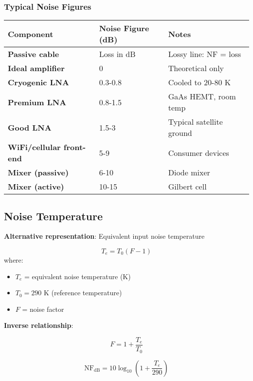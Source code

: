 \subsubsection{Typical Noise Figures}\label{typical-noise-figures}

{\def\LTcaptype{} %
\begin{longtable}[]{@{}lll@{}}
\toprule\noalign{}
Component & Noise Figure (dB) & Notes \\
\midrule\noalign{}
\endhead
\bottomrule\noalign{}
\endlastfoot
\textbf{Passive cable} & Loss in dB & Lossy line: NF = loss \\
\textbf{Ideal amplifier} & 0 & Theoretical only \\
\textbf{Cryogenic LNA} & 0.3-0.8 & Cooled to 20-80 K \\
\textbf{Premium LNA} & 0.8-1.5 & GaAs HEMT, room temp \\
\textbf{Good LNA} & 1.5-3 & Typical satellite ground \\
\textbf{WiFi/cellular front-end} & 5-9 & Consumer devices \\
\textbf{Mixer (passive)} & 6-10 & Diode mixer \\
\textbf{Mixer (active)} & 10-15 & Gilbert cell \\
\end{longtable}
}

\subsection{Noise Temperature}

\textbf{Alternative representation}: Equivalent input noise temperature

\begin{equation}
T_e = T_0 (F - 1)
\end{equation}
where:
\begin{itemize}
\item $T_e$ = equivalent noise temperature (K)
\item $T_0 = 290$ K (reference temperature)
\item $F$ = noise factor
\end{itemize}

\textbf{Inverse relationship}:

\begin{equation}
F = 1 + \frac{T_e}{T_0}
\end{equation}

\begin{equation}
\text{NF}_{\text{dB}} = 10\log_{10}\left(1 + \frac{T_e}{290}\right)
\end{equation}

